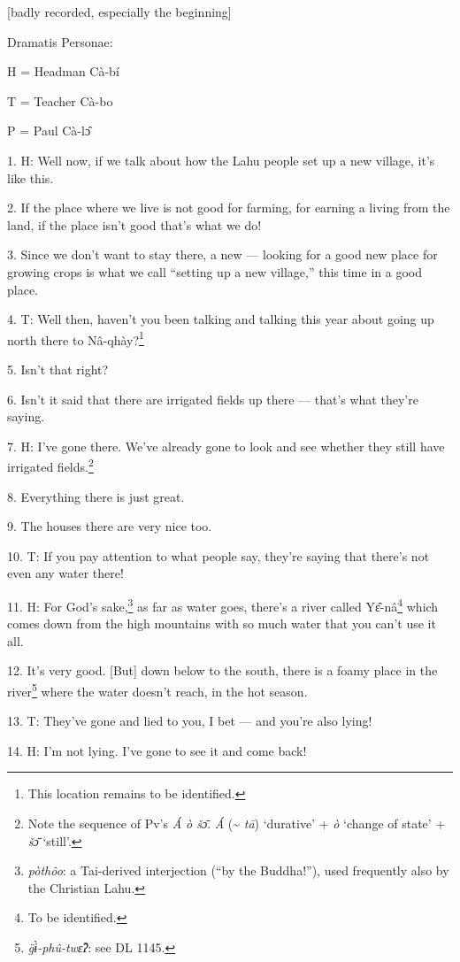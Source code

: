 
[badly recorded, especially the beginning]

Dramatis Personae:

H = Headman Cà-bí

T = Teacher Cà-bo

P = Paul Cà-lɔ̂

1. H: Well now, if we talk about how the Lahu people set up a new village, it's
like this.

2. If the place where we live is not good for farming, for earning a living from
the land, if the place isn't good that's what we do!

3. Since we don't want to stay there, a new --- looking for a good new place for
growing crops is what we call ``setting up a new village,'' this time in a good
place.

4. T: Well then, haven't you been talking and talking this year about going up
north there to Nâ-qhày?\footnote{This location remains to be identified.}

5. Isn't that right?

6. Isn't it said that there are irrigated fields up there --- that's what they're
saying.

7. H: I've gone there. We've already gone to look and see whether they still have
irrigated fields.\footnote{Note the sequence of Pv's \textit{Á ò šɔ̄}. \textit{Á} (\textasciitilde{} \textit{tā}) `durative' + \textit{ò} `change of state' + \textit{šɔ̄} `still'.}

8. Everything there is just great.

9. The houses there are very nice too.

10. T: If you pay attention to what people say, they're saying that there's not
even any water there!

11. H: For God's sake,\footnote{\textit{pòthôo}: a Tai-derived interjection (``by the Buddha!''), used frequently also by the Christian Lahu.} as far as water goes, there's a river called Yɛ̂-nâ\footnote{To be identified.}
which comes down from the high mountains with so much water that you can't use
it all.

12. It's very good. [But] down below to the south, there is a foamy place in the
river\footnote{\textit{g̈ɨ̀-phû-twɛ̂ʔ}: see DL 1145.} where the water doesn't reach, in the hot season.

13. T: They've gone and lied to you, I bet --- and you're also lying!

14. H: I'm not lying. I've gone to see it and come back!

